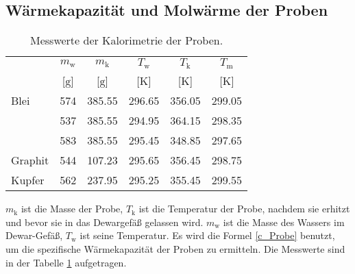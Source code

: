 \subsection{Wärmekapazität und Molwärme der Proben}
\begin{table}[htp]
	\centering
	\begin{tabular}{lccccc}
		\toprule
		& {$m_\text{w}$} & {$m_\text{k}$} & {$T_\text{w}$} & {$T_\text{k}$} & {$T_\text{m}$}\\
		&[{$\si{\gram}$}]& {[$\si{\gram}$]}  &{[$\si{\kelvin}$]}& {[$\si{\kelvin}$]}  &{[$\si{\kelvin}$]}\\
		\midrule
		Blei		&574&	385.55	& 296.65 &	356.05&	299.05\\
					&537&	385.55	& 294.95 &	364.15&	298.35\\
					&583&	385.55	& 295.45 &	348.85&	297.65\\	
		Graphit		&544&	107.23	& 295.65 &	356.45&	298.75\\
		Kupfer		&562& 	237.95	& 295.25 &	355.45&	299.55\\
		\bottomrule
	\end{tabular}
	\caption{Messwerte der Kalorimetrie der Proben.}
	\label{tab:messung2}
\end{table}
$m_\text{k}$ ist die Masse der Probe, $T_\text{k}$ ist die Temperatur der Probe, nachdem sie erhitzt und bevor sie in das Dewargefäß gelassen wird.
$m_\text{w}$ ist die Masse des Wassers im Dewar-Gefäß, $T_\text{w}$ ist seine Temperatur.
Es wird die Formel \eqref{c_Probe}
benutzt, um die spezifische Wärmekapazität der Proben zu ermitteln.
Die Messwerte sind in der Tabelle \ref{tab:messung2} aufgetragen.

